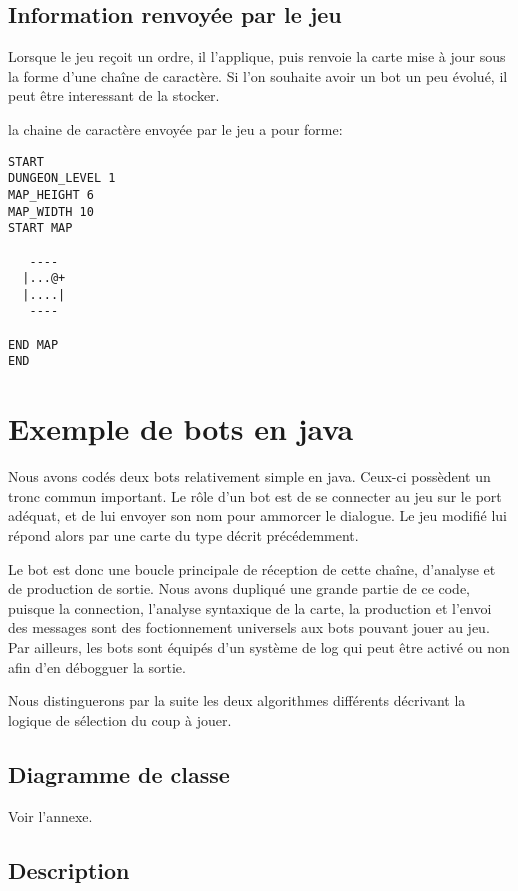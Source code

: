\subsection{Information renvoyée par le jeu}
Lorsque le jeu reçoit un ordre, il l'applique, puis renvoie la carte mise à jour sous la forme d'une chaîne de caractère. Si l'on souhaite avoir un bot un peu évolué, il peut être interessant de la stocker. 

la chaine de caractère envoyée par le jeu a pour forme:

\begin{verbatim}
START
DUNGEON_LEVEL 1
MAP_HEIGHT 6
MAP_WIDTH 10
START MAP
          
   ----   
  |...@+  
  |....|  
   ----   
          
END MAP
END
\end{verbatim}



\section{Exemple de bots en java}

Nous avons codés deux bots relativement simple en java. Ceux-ci possèdent un tronc commun important. 
Le rôle d'un bot est de se connecter au jeu sur le port adéquat, et de lui envoyer son nom pour ammorcer le dialogue. Le jeu modifié lui répond alors par une carte du type décrit précédemment. 

Le bot est donc une boucle principale de réception de cette chaîne, d'analyse et de production de sortie. Nous avons dupliqué une grande partie de ce code, puisque la connection, l'analyse syntaxique de la carte, la production et l'envoi des messages sont des foctionnement universels aux bots pouvant jouer au jeu. Par ailleurs, les bots sont équipés d'un système de log qui peut être activé ou non afin d'en débogguer la sortie. 

Nous distinguerons par la suite les deux algorithmes différents décrivant la logique de sélection du coup à jouer.

\subsection{Diagramme de classe}

Voir l'annexe.
 
\subsection{Description}

